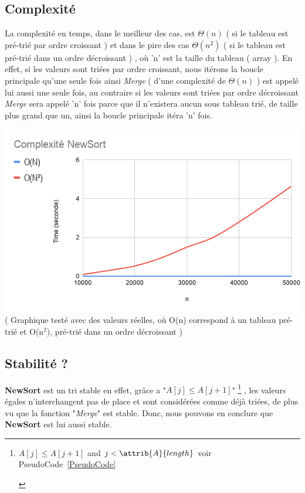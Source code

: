 \documentclass[a4paper, 11pt, oneside]{article}
\begin{document}
\subsection{Complexité}
La complexité en temps, dans le meilleur des cas, est $\Theta(n)$ ( si le tableau est pré-trié par ordre croissant ) et dans le pire des cas $\Theta(n^{2})$ ( si le tableau est pré-trié dans un ordre décroissant ) , où 'n' est la taille du tableau ( array ). En effet, si les valeurs sont triées par ordre croissant, nous itérons la boucle principale qu'une seule fois ainsi \textit{Merge} ( d'une complexité de $\Theta(n)$ ) est appelé lui aussi une seule fois, au contraire si  les valeurs sont triées par ordre décroissant \textit{Merge} sera appelé 'n' fois parce que il n'existera aucun sous tableau trié, de taille plus grand que un, ainsi la boucle principale itéra 'n' fois.     

\includegraphics[scale=0.6]{graphique.png} \\
( Graphique testé avec des valeurs réelles, où O(n) correspond à un tableau pré-trié et O(n$^{2}$), pré-trié dans un ordre décroissant ) 


\subsection{Stabilité ?}
\textbf{NewSort}
 est un tri stable en effet, grâce a "\textit{$A[j]\leq A[j+1]$}"
	\footnote{\begin{codebox}
	\While $A[j] \leq A[j+1]$ and $j < \attrib{A}{length}$
voir PseudoCode~\ref{PseudoCode}
\End
\end{codebox} }
, les valeurs égales n'interchangent pas de place et sont considérées comme déjà triées, de plus vu que la fonction "\textit{Merge}" est stable. Donc, nous pouvons en conclure que \textbf{NewSort} est lui aussi stable. 
\end{document}
